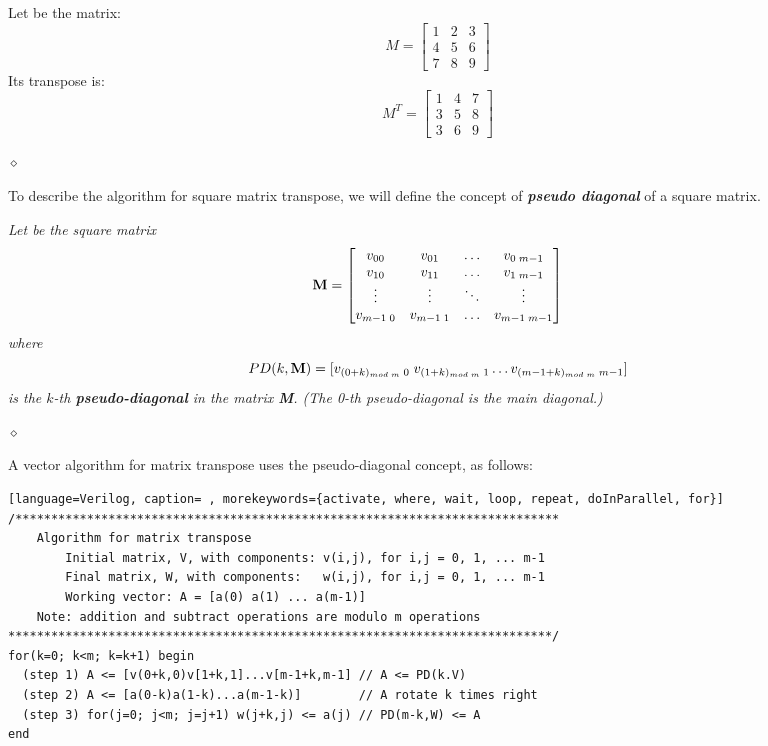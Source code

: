 \begin{exemplu}
Let be the matrix:
\[
M = \begin{bmatrix}
    1 & 2 & 3 \\
    4 & 5 & 6\\
    7 & 8 & 9
    \end{bmatrix}
\]
Its transpose is:
\[
M^T = \begin{bmatrix}
    1 & 4 & 7 \\
    3 & 5 & 8\\
    3 & 6 & 9
    \end{bmatrix}
\]

$\diamond$
\end{exemplu}

To describe the algorithm for square matrix transpose, we will define the concept of {\bf {\em pseudo diagonal}} of a square matrix.

\begin{definition}
{\em
Let be the square matrix
\[{\bf M} =
\begin{bmatrix}
    v_{00} & v_{01} & \dots  & v_{0 \; m-1}\\
    v_{10} & v_{11} & \dots  & v_{1 \; m-1}\\
    \vdots & \vdots & \ddots & \vdots\\
    v_{m-1 \; 0} & v_{m-1 \; 1} & \dots  & v_{m-1 \; m-1}
    \end{bmatrix}
\]
where $$PD(k,{\bf M}) = [v_{(0+k)_{mod \; m} \; 0} \; v_{(1+k)_{mod \; m} \; 1} \ldots v_{(m-1+k)_{mod \; m} \; m-1}]$$ is the $k$-th {\bf {\em pseudo-diagonal}} in the matrix {\bf M}. (The 0-th pseudo-diagonal is the main diagonal.)
}

$\diamond$
\end{definition}

A vector algorithm for matrix transpose uses the pseudo-diagonal concept, as follows:

{\footnotesize
\begin{shaded*}
\begin{lstlisting}[language=Verilog, caption= , morekeywords={activate, where, wait, loop, repeat, doInParallel, for}]
/****************************************************************************
    Algorithm for matrix transpose
        Initial matrix, V, with components: v(i,j), for i,j = 0, 1, ... m-1
        Final matrix, W, with components:   w(i,j), for i,j = 0, 1, ... m-1
        Working vector: A = [a(0) a(1) ... a(m-1)]
    Note: addition and subtract operations are modulo m operations
****************************************************************************/
for(k=0; k<m; k=k+1) begin
  (step 1) A <= [v(0+k,0)v[1+k,1]...v[m-1+k,m-1] // A <= PD(k.V)
  (step 2) A <= [a(0-k)a(1-k)...a(m-1-k)]        // A rotate k times right
  (step 3) for(j=0; j<m; j=j+1) w(j+k,j) <= a(j) // PD(m-k,W) <= A
end
\end{lstlisting}
\end{shaded*}
}


